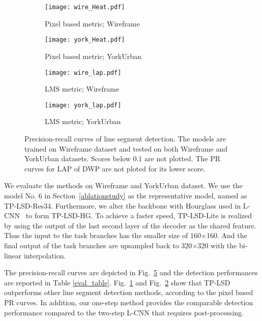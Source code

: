 \documentclass[runningheads]{llncs}
\begin{document}
\begin{figure}[t]
\begin{center}
     \begin{subfigure}[b]{0.24\textwidth}
         \centering
         \texttt{[image: wire\_Heat.pdf]}
         \caption{\centering Pixel based metric; Wireframe} 
         \label{sub_fig:pr_a}
     \end{subfigure}
     \begin{subfigure}[b]{0.24\textwidth}
         \centering
         \texttt{[image: york\_Heat.pdf]}
\caption{\centering Pixel based metric; YorkUrban} 
         \label{sub_fig:pr_b}
     \end{subfigure}
     \begin{subfigure}[b]{0.24\textwidth}
         \centering
         \texttt{[image: wire\_lap.pdf]}
         \caption{\centering LMS metric; Wireframe} \label{sub_fig:pr_c}
     \end{subfigure}
     \begin{subfigure}[b]{0.24\textwidth}
         \centering
         \texttt{[image: york\_lap.pdf]}
         \caption{\centering LMS metric; YorkUrban} 
         \label{sub_fig:pr_d}
     \end{subfigure}
  \end{center}
    \caption{Precision-recall curves of line segment detection. The models are trained on Wireframe dataset and tested on both Wireframe and YorkUrban datasets. Scores below $0.1$ are not plotted. The PR curves for LAP of DWP are not ploted for its lower score.}
    \label{PR_pixel}
\end{figure}


We evaluate the methods on Wireframe and YorkUrban dataset. We use the model No. 6 in Section~\ref{ablationstudy} as the representative model, named as TP-LSD-Res34. Furthermore, we alter the backbone with Hourglass used in L-CNN~\cite{LCNN} to form TP-LSD-HG. To achieve a faster speed, TP-LSD-Lite is realized by using the output of the last second layer of the decoder as the shared feature. Thus the input to the task branches has the smaller size of 160$\times$160. And the final output of the task branches are upsampled back to 320$\times$320 with the bi-linear interpolation.


The precision-recall curves are depicted in Fig.~\ref{PR_pixel} and the detection performances are reported in Table \ref{eval_table}.
Fig.~\ref{sub_fig:pr_a} and Fig.~\ref{sub_fig:pr_b} show that TP-LSD outperforms other line segment detection methods, according to the pixel based PR curves. In addition, our one-step method provides the comparable detection performance compared to the two-step L-CNN that requires post-processing.
\end{document}
